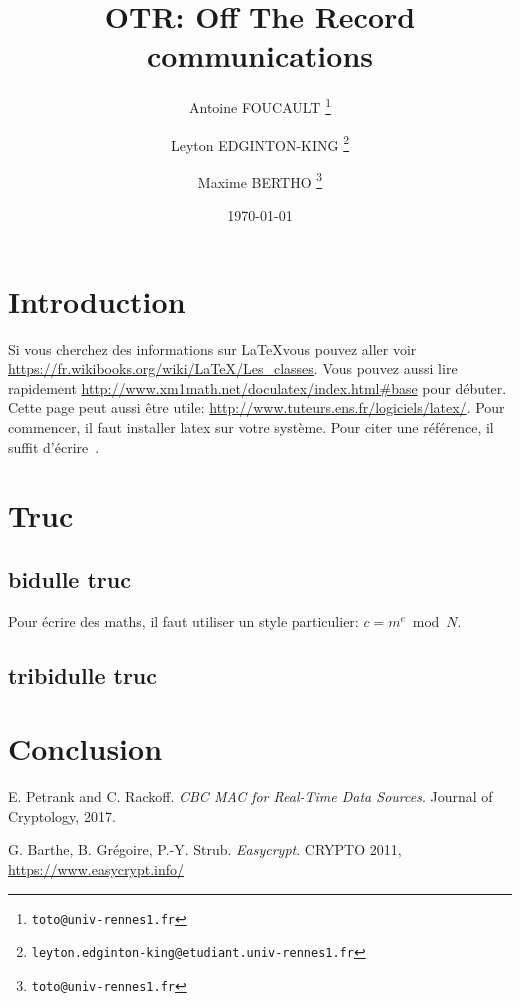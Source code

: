 \documentclass[12pt]{article}
\begin{document}
\pagestyle{empty}

\title{OTR: Off The Record communications}

\author{Antoine FOUCAULT%
  \thanks{\texttt{toto@univ-rennes1.fr}}}

\author{Leyton EDGINTON-KING %
  \thanks{\texttt{leyton.edginton-king@etudiant.univ-rennes1.fr}}}

\author{Maxime BERTHO%
  \thanks{\texttt{toto@univ-rennes1.fr}}}


\date{\today}

\maketitle

\newpage
\tableofcontents

\newpage
\section{Introduction}
Si vous cherchez des informations sur \LaTeX vous pouvez aller voir \url{https://fr.wikibooks.org/wiki/LaTeX/Les_classes}. 
Vous pouvez aussi lire rapidement \url{http://www.xm1math.net/doculatex/index.html#base} pour débuter. Cette page peut aussi être utile: \url{http://www.tuteurs.ens.fr/logiciels/latex/}. Pour commencer, il faut installer latex sur votre système. 
Pour citer une référence, il suffit d'écrire~\cite{PR97}.

\section{Truc}
\subsection{bidulle truc}
Pour écrire des maths, il faut utiliser un style particulier: 
$c=m^e \bmod N$.

\subsection{tribidulle truc}

\section{Conclusion}



%
% 
\newpage
\begin{thebibliography}{9}
E. Petrank and C. Rackoff. 
\emph{CBC MAC for Real-Time Data Sources}.
Journal of Cryptology, 2017.

G. Barthe, B. Grégoire, P.-Y. Strub. 
\emph{Easycrypt}. 
CRYPTO 2011, \url{https://www.easycrypt.info/}

\end{thebibliography}
\end{document}
